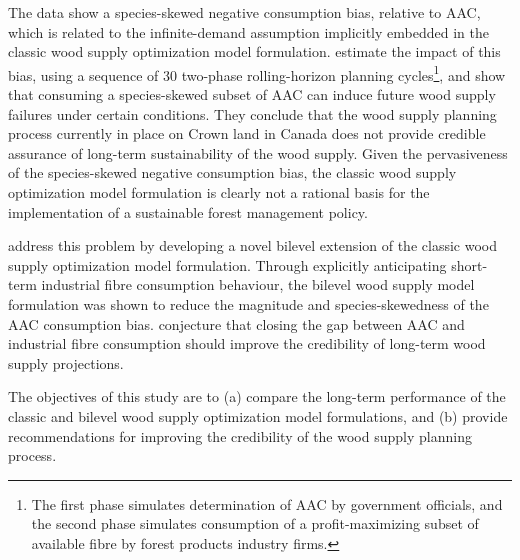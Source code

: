 The data show a species-skewed negative consumption bias, relative to AAC, which is related to the infinite-demand assumption implicitly embedded in the classic wood supply optimization model formulation. 
\citet{paradis2013risk} estimate the impact of this bias, using a sequence of 30 two-phase rolling-horizon planning cycles\footnote{The first phase simulates determination of AAC by government officials, and the second phase simulates consumption of a profit-maximizing subset of available fibre by forest products industry firms.}, and show that consuming a species-skewed subset of AAC can induce future wood supply failures under certain conditions. They conclude that the wood supply planning process currently in place on Crown land in Canada does not provide credible assurance of long-term sustainability of the wood supply. Given the pervasiveness of the species-skewed negative consumption bias, the classic wood supply optimization model formulation is clearly not a rational basis for the implementation of a sustainable forest management policy. 

\citet{paradis2014bilevel} address this problem by developing a novel bilevel extension of the classic wood supply optimization model formulation. Through explicitly anticipating short-term industrial fibre consumption behaviour, the bilevel wood supply model formulation was shown to reduce the magnitude and species-skewedness of the AAC consumption bias. \citet{paradis2013risk} conjecture that closing the gap between AAC and industrial fibre consumption should improve the credibility of long-term wood supply projections.

The objectives of this study are to (a) compare the long-term performance of the classic and bilevel wood supply optimization model formulations, and (b) provide recommendations for improving the credibility of the wood supply planning process.




